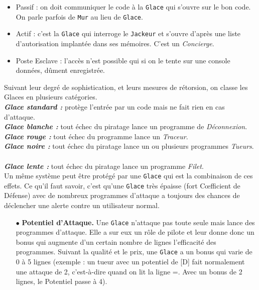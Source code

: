 \documentclass[11pt,twoside,a4paper]{article}
\begin{document}
\begin{multicols*}{2}
\begin{minipage}[h]{0.38\textwidth}
\begin{itemize}
	\end{itemize}
\end{minipage}
	\begin{itemize}
		\small
		\item Passif : on doit communiquer le code {\`a} la \texttt{Glace} qui s'ouvre sur le bon code. On parle parfois de \texttt{Mur} au lieu de \texttt{Glace}. 
		\item Actif : c'est la \texttt{Glace} qui interroge le \texttt{Jackeur} et s'ouvre d'apr{\`e}s une liste d'autorisation implant{\'e}e dans ses m{\'e}moires. C'est un \emph{Concierge}. 
		\item Poste Esclave : l'acc{\`e}s n'est possible qui si on le tente sur une console donn{\'e}es, d{\^u}ment enregistr{\'e}e. 
	\end{itemize}
	Suivant leur degr{\'e} de sophistication, et leurs mesures de r{\'e}torsion, on classe les Glaces en plusieurs cat{\'e}gories. ~\\
	\textbf{\textit{Glace standard : }}prot{\`e}ge l'entr{\'e}e par un code mais ne fait rien en cas d'attaque. ~\\
	\textbf{\textit{Glace blanche : }}tout {\'e}chec du piratage lance un programme de \emph{D{\'e}connexion}. ~\\
	\textbf{\textit{Glace rouge : }}tout {\'e}chec du programme lance un \emph{Traceur}. ~\\
	\textbf{\textit{Glace noire : }}tout {\'e}chec du piratage lance un ou plusieurs programmes \emph{Tueurs}. ~\\
	\textbf{\textit{Glace lente : }}tout {\'e}chec du piratage lance un programme \emph{Filet}. ~\\
	Un m{\^e}me syst{\`e}me peut {\^e}tre prot{\'e}g{\'e} par une \texttt{Glace} qui est la combinaison de ces effets. Ce qu'il faut savoir, c'est qu'une \texttt{Glace} tr{\`e}s {\'e}paisse (fort C\oe fficient de D{\'e}fense) avec de nombreux programmes d'attaque a toujours des chances de d{\'e}clencher une alerte contre un utilisateur normal. %
\begin{itemize}
	\item[$\bullet$] \textbf{Potentiel d'Attaque. }Une \texttt{Glace} n'attaque pas toute seule mais lance des programmes d'attaque. Elle a sur eux un r{\^o}le de pilote et leur donne donc un bonus qui augmente d'un certain nombre de lignes l'efficacit{\'e} des programmes. Suivant la qualit{\'e} et le prix, une \texttt{Glace} a un bonus qui varie de 0 {\`a} 5 lignes (exemple : un tueur avec un potentiel de [D] fait normalement une attaque de 2, c'est-{\`a}-dire quand on lit la ligne =. Avec un bonus de 2 lignes, le Potentiel passe {\`a} 4). 

\end{itemize}
\end{multicols*}
\end{document}
